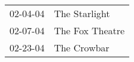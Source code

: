 \begin{supertabular}{p{0.25\columnwidth}p{0.75\columnwidth}}
 02-04-04 &    The Starlight \\
 02-07-04 &  The Fox Theatre \\
 02-23-04 &      The Crowbar \\
\end{supertabular}

